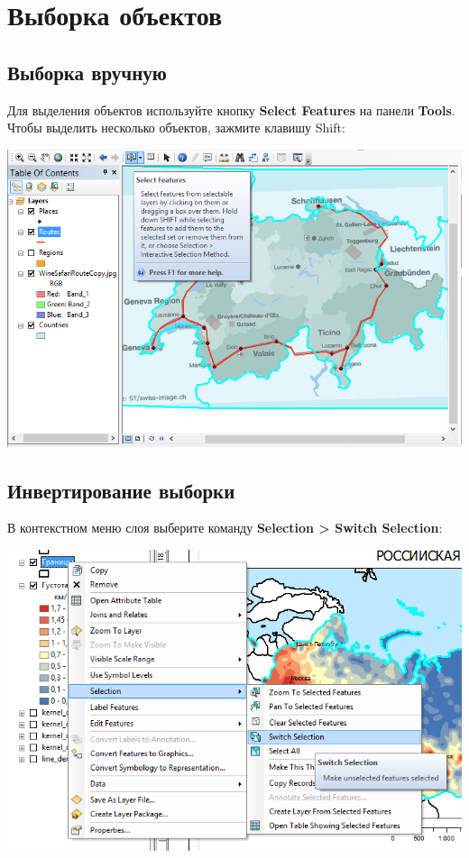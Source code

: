 \documentclass[12pt,]{book}
\begin{document}
\hypertarget{manual-select}{%
\chapter{Выборка объектов}\label{manual-select}}

\hypertarget{manual-select-manual}{%
\section{Выборка вручную}\label{manual-select-manual}}

Для выделения объектов используйте кнопку \textbf{Select Features} на панели \textbf{Tools}. Чтобы выделить несколько объектов, зажмите клавишу Shift:

\includegraphics{images/Appendix/image94.png}

\hypertarget{manual-select-invert}{%
\section{Инвертирование выборки}\label{manual-select-invert}}

В контекстном меню слоя выберите команду \textbf{Selection \textgreater{} Switch Selection}:

\includegraphics{images/Appendix/image95.png}
\end{document}
